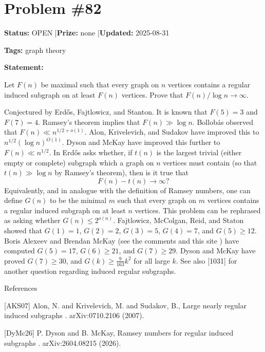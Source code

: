 \documentclass{article}
\begin{document}
\section{Problem \#82}
\label{prob:82}

\noindent\textbf{Status:} OPEN \quad|\quad \textbf{Prize:} none \quad|\quad \textbf{Updated:} 2025-08-31

\noindent\textbf{Tags:} graph theory

\medskip

\noindent\textbf{Statement:}

Let $F(n)$ be maximal such that every graph on $n$ vertices contains a regular induced subgraph on at least $F(n)$ vertices. Prove that $F(n)/\log n\to \infty$.




Conjectured by Erd\H{o}s, Fajtlowicz, and Stanton. It is known that $F(5)=3$ and $F(7)=4$. Ramsey's theorem implies that $F(n)\gg \log n$. Bollob\'{a}s observed that $F(n)\ll n^{1/2+o(1)}$. Alon, Krivelevich, and Sudakov \cite{AKS07} have improved this to $n^{1/2}(\log n)^{O(1)}$. Dyson and McKay \cite{DyMc26} have improved this further to $F(n) \ll n^{1/2}$. In \cite{Er93} Erd\H{o}s asks whether, if $t(n)$ is the largest trivial (either empty or complete) subgraph which a graph on $n$ vertices must contain (so that $t(n) \gg \log n$ by Ramsey's theorem), then is it true that\[F(n)-t(n)\to \infty?\]Equivalently, and in analogue with the definition of Ramsey numbers, one can define $G(n)$ to be the minimal $m$ such that every graph on $m$ vertices contains a regular induced subgraph on at least $n$ vertices. This problem can be rephrased as asking whether $G(n) \leq 2^{o(n)}$. Fajtlowicz, McColgan, Reid, and Staton \cite{FMRS95} showed that $G(1)=1$, $G(2)=2$, $G(3)=5$, $G(4)=7$, and $G(5)\geq 12$. Boris Alexeev and Brendan McKay (see the comments and this site ) have computed $G(5)=17$, $G(6)\geq 21$, and $G(7)\geq 29$. Dyson and McKay \cite{DyMc26} have proved $G(7)\geq 30$, and $G(k)\geq \frac{9}{163}k^2$ for all large $k$. See also [1031] for another question regarding induced regular subgraphs.




References

[AKS07] Alon, N. and Krivelevich, M. and Sudakov, B., Large nearly regular induced subgraphs . arXiv:0710.2106 (2007).

[DyMc26] P. Dyson and B. McKay, Ramsey numbers for regular induced subgraphs . arXiv:2604.08215 (2026).
\end{document}
